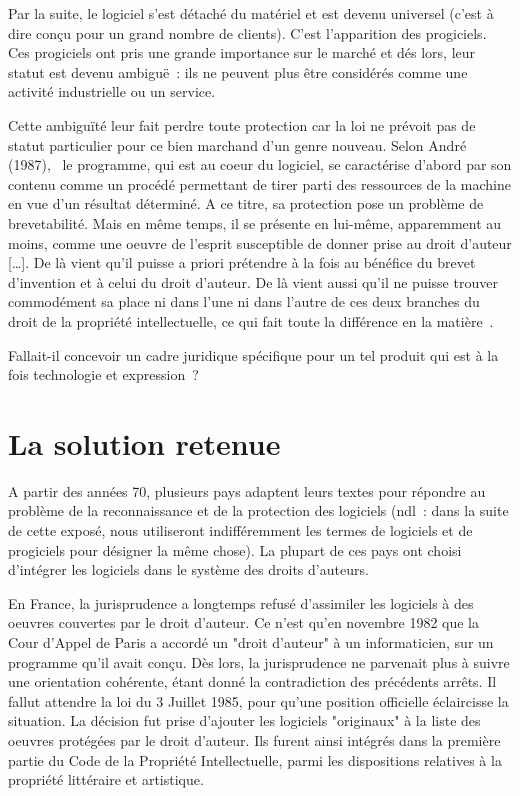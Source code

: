 \documentclass[pdftex,a4paper,11pt]{report}
\begin{document}
Par la suite, le logiciel s'est détaché du matériel et est devenu universel (c'est à dire conçu pour un grand nombre de clients). C'est l'apparition des progiciels. Ces progiciels ont pris une grande importance sur le marché et dés lors, leur statut est devenu ambiguë~: ils ne peuvent plus être considérés comme une activité industrielle ou un service.

Cette ambiguïté leur fait perdre toute protection car la loi ne prévoit pas de statut particulier pour ce bien marchand d'un genre nouveau. Selon André  (1987), \og~le programme, qui est au coeur du logiciel, se caractérise d'abord par son contenu comme un procédé permettant de tirer parti des ressources de la machine en vue d'un résultat déterminé. A ce titre, sa protection pose un problème de brevetabilité. Mais en même temps, il se présente en lui-même, apparemment au moins, comme une oeuvre de l'esprit susceptible de donner prise au droit d'auteur [\dots]. De là vient qu'il puisse a priori prétendre à la fois au bénéfice du brevet d'invention et à celui du droit d'auteur. De là vient aussi qu'il ne puisse trouver commodément sa place ni dans l'une ni dans l'autre de ces deux branches du droit de la propriété intellectuelle, ce qui fait toute la différence en la matière~\fg.

Fallait-il concevoir un cadre juridique spécifique pour un tel produit qui est à la fois technologie et expression~?

\section{La solution retenue}
A partir des années 70, plusieurs pays adaptent leurs textes pour répondre au problème de la reconnaissance et de la protection des logiciels (ndl~: dans la suite de cette exposé, nous utiliseront indifféremment les termes de logiciels et de progiciels pour désigner la même chose). La plupart de ces pays ont choisi d'intégrer les logiciels dans le système des droits d'auteurs.

En France, la jurisprudence a longtemps refusé d'assimiler les logiciels à des oeuvres couvertes par le droit d'auteur. Ce n'est qu'en novembre 1982 que la Cour d'Appel de Paris a accordé un "droit d'auteur" à un informaticien, sur un programme qu'il avait conçu. Dès lors, la jurisprudence ne parvenait plus à suivre une orientation cohérente, étant donné la contradiction des précédents arrêts. Il fallut attendre la loi du 3 Juillet 1985, pour qu'une position officielle éclaircisse la situation. La décision fut prise d'ajouter les logiciels "originaux" à la liste des oeuvres protégées par le droit d'auteur. Ils furent ainsi intégrés dans la première partie du Code de la Propriété Intellectuelle, parmi les dispositions relatives à la propriété littéraire et artistique.
\end{document}
